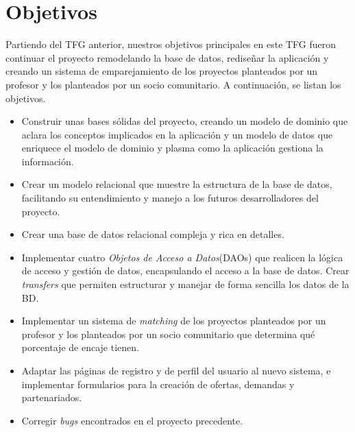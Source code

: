 \documentclass[11pt]{book}
\begin{document}
\section{Objetivos}
Partiendo del TFG anterior, nuestros objetivos principales en este TFG fueron continuar el proyecto remodelando la base de datos, rediseñar la aplicación y creando un sistema de emparejamiento de los proyectos planteados por un profesor y los planteados por un socio comunitario.
A continuación, se listan los objetivos.
\begin{itemize} 
	\item Construir unas bases sólidas del proyecto, creando un modelo de dominio que aclara los conceptos implicados en la aplicación y un modelo de datos que enriquece el modelo de dominio y plasma como la aplicación gestiona la información.
	\item Crear un modelo relacional que muestre la estructura de la base de datos, facilitando su entendimiento y manejo a los futuros desarrolladores del proyecto.
	\item Crear una base de datos relacional compleja y rica en detalles.
	\item Implementar cuatro \emph{Objetos de Acceso a Datos}(DAOs) que realicen la lógica de acceso y gestión de datos, encapsulando el acceso a la base de datos. Crear \textit{transfers} que permiten estructurar y manejar de forma sencilla los datos de la BD.
	\item Implementar un sistema de \textit{matching} de los proyectos planteados por un profesor y los planteados por un socio comunitario que determina qué porcentaje de encaje tienen.
	\item Adaptar las páginas de registro y de perfil del usuario al nuevo sistema, e implementar formularios para la creación de ofertas, demandas y partenariados.
	\item Corregir \textit{bugs} encontrados en el proyecto precedente.
\end{itemize}
\end{document}
